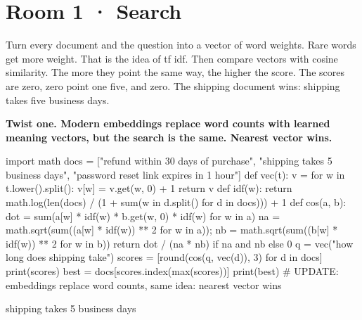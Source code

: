 \documentclass[11pt,a4paper]{report}
\begin{document}
\section*{Room 1 · Search}
Turn every document and the question into a vector of word weights. Rare words get more weight. That is the idea of tf idf. Then compare vectors with cosine similarity. The more they point the same way, the higher the score. The scores are zero, zero point one five, and zero. The shipping document wins: shipping takes five business days.
\begin{tcolorbox}[colback=yellow!12,colframe=orange!70!black,boxrule=0.4pt,left=4pt,right=4pt,top=2pt,bottom=2pt]\textbf{Twist one. Modern embeddings replace word counts with learned meaning vectors, but the search is the same. Nearest vector wins.}\end{tcolorbox}
\begin{Code}
import math
docs = ["refund within 30 days of purchase",
        "shipping takes 5 business days",
        "password reset link expires in 1 hour"]
def vec(t):
    v = {}
    for w in t.lower().split(): v[w] = v.get(w, 0) + 1
    return v
def idf(w): return math.log(len(docs) / (1 + sum(w in d.split() for d in docs))) + 1
def cos(a, b):
    dot = sum(a[w] * idf(w) * b.get(w, 0) * idf(w) for w in a)
    na = math.sqrt(sum((a[w] * idf(w)) ** 2 for w in a)); nb = math.sqrt(sum((b[w] * idf(w)) ** 2 for w in b))
    return dot / (na * nb) if na and nb else 0
q = vec("how long does shipping take")
scores = [round(cos(q, vec(d)), 3) for d in docs]
print(scores)
best = docs[scores.index(max(scores))]
print(best)
# UPDATE: embeddings replace word counts, same idea: nearest vector wins
\end{Code}
\begin{Out}
[0.0, 0.15, 0.0]
shipping takes 5 business days
\end{Out}
\end{document}
